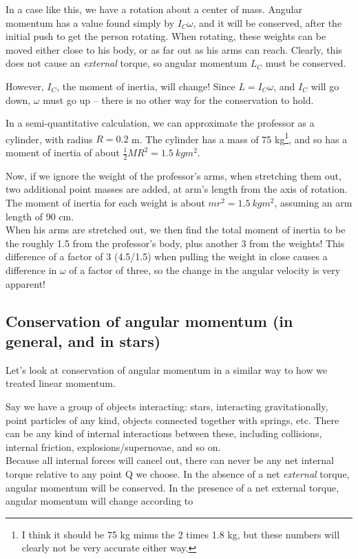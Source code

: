 In a case like this, we have a rotation about a center of mass. Angular momentum has a value found simply by $I_C \omega$, and it will be conserved, after the initial push to get the person rotating. When rotating, these weights can be moved either close to his body, or as far out as his arms can reach. Clearly, this does not cause an \emph{external} torque, so angular momentum $L_C$ must be conserved.

However, $I_C$, the moment of inertia, will change! Since $L = I_C \omega$, and $I_C$ will go down, $\omega$ must go up -- there is no other way for the conservation to hold.

In a semi-quantitative calculation, we can approximate the professor as a cylinder, with radius $R = 0.2$ m. The cylinder has a mass of 75 kg\footnote{I think it should be 75 kg minus the 2 times 1.8 kg, but these numbers will clearly not be very accurate either way.}, and so has a moment of inertia of about $\frac{1}{2} M R^2 = \SI{1.5}{kg m^2}$.

Now, if we ignore the weight of the professor's arms, when stretching them out, two additional point masses are added, at arm's length from the axis of rotation. The moment of inertia for each weight is about $m r^2 = \SI{1.5}{kg m^2}$, assuming an arm length of 90 cm.\\
When his arms are stretched out, we then find the total moment of inertia to be the roughly 1.5 from the professor's body, plus another 3 from the weights! This difference of a factor of 3 (4.5/1.5) when pulling the weight in close causes a difference in $\omega$ of a factor of three, so the change in the angular velocity is very apparent!

\subsection{Conservation of angular momentum (in general, and in stars)}

Let's look at conservation of angular momentum in a similar way to how we treated linear momentum.

Say we have a group of objects interacting: stars, interacting gravitationally, point particles of any kind, objects connected together with springs, etc. There can be any kind of internal interactions between these, including collisions, internal friction, explosions/supernovae, and so on.\\
Because all internal forces will cancel out, there can never be any net internal torque relative to any point Q we choose. In the absence of a net \emph{external} torque, angular momentum will be conserved. In the presence of a net external torque, angular momentum will change according to

